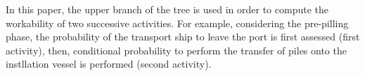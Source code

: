 In this paper, the upper branch of the tree is used in order to compute the workability of two successive activities. For example, considering the pre-pilling phase, the probability of the transport ship to leave the port is first assessed (first activity), then, conditional probability to perform the transfer of piles onto the instllation vessel is performed (second activity).